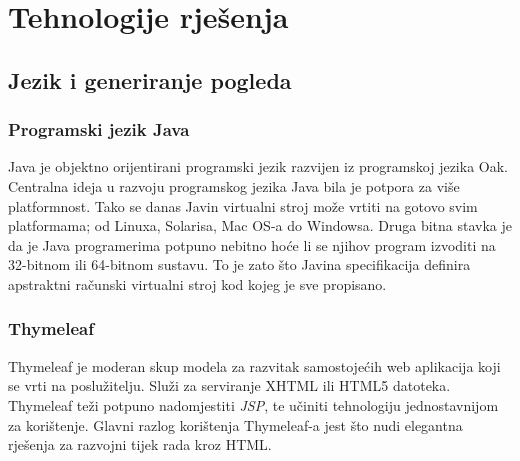 \documentclass[times, utf8, zavrsni, numeric]{fer}
\begin{document}
\chapter{Tehnologije rješenja}
\section{Jezik i generiranje pogleda}
\subsection{Programski jezik Java}
\qquad Java je objektno orijentirani programski jezik razvijen iz programskoj jezika Oak\footnotemark{}.
Centralna ideja u razvoju programskog jezika Java bila je potpora za više platformnost.
Tako se danas Javin virtualni stroj može vrtiti na gotovo svim platformama; od Linuxa, Solarisa, Mac OS-a do Windowsa.
Druga bitna stavka je da je Java programerima potpuno nebitno hoće li se njihov program izvoditi na 32-bitnom ili 64-bitnom sustavu.
To je zato što Javina specifikacija definira apstraktni računski virtualni stroj kod kojeg je sve propisano.
\subsection{Thymeleaf}
\qquad Thymeleaf je moderan skup modela za razvitak samostojećih web aplikacija koji se vrti na poslužitelju.
Služi za serviranje XHTML ili HTML5 datoteka.
Thymeleaf teži potpuno nadomjestiti \textit{JSP}\footnotemark{}, te učiniti tehnologiju jednostavnijom za korištenje.
Glavni razlog korištenja Thymeleaf-a jest što nudi elegantna rješenja za razvojni tijek rada kroz HTML.
\end{document}
